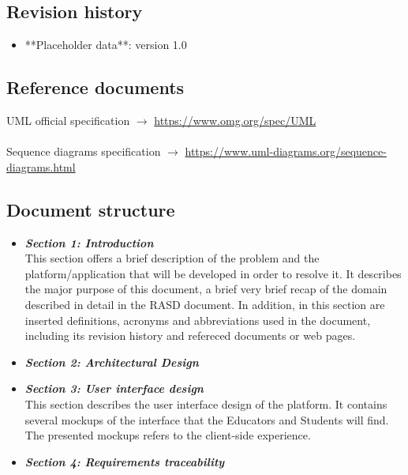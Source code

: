\documentclass{article}
\begin{document}
{    \subsection{Revision history}
        \begin{itemize}
            \item **Placeholder data**: version 1.0
        \end{itemize}
    
    \subsection{Reference documents}
        UML official specification $\rightarrow$ \url{https://www.omg.org/spec/UML}
        \\ \\
        Sequence diagrams specification $\rightarrow$ \url{https://www.uml-diagrams.org/sequence-diagrams.html}
    \subsection{Document structure}
        \begin{itemize}
            \item \textbf{\textit{Section 1: Introduction}} \\
                This section offers a brief description of the problem and the platform/application that will be developed in order to resolve it.
                It describes the major purpose of this document, a brief very brief recap of the domain described in detail
                in the RASD document.
                In addition, in this section are inserted definitions, acronyms and abbreviations used in the document, including 
                its revision history and refereced documents or web pages.
            \item \textbf{\textit{Section 2: Architectural Design}} \\
                  
            \item \textbf{\textit{Section 3: User interface design}} \\
                This section describes the user interface design of the platform.
                It contains several mockups of the interface that the Educators and
                Students will find. The presented mockups refers to the client-side
                experience.
            \item \textbf{\textit{Section 4: Requirements traceability}} \\
                  

\end{itemize}}
\end{document}
